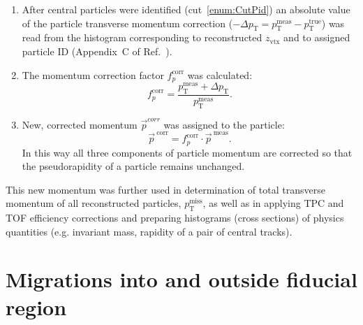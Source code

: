 \begin{enumerate}
	\item After central particles were identified (cut~\ref{enum:CutPid}) an absolute value of the particle transverse momentum correction ($-\Delta p_{\text{T}} = p_{\text{T}}^{\text{meas}}-p_{\text{T}}^{\text{true}}$) was read from the histogram corresponding to reconstructed $z_{\text{vtx}}$ and to assigned particle ID (Appendix~C of Ref.~\cite{supplementaryNote}).
	\item The momentum correction factor $f_{p}^{\text{corr}}$ was calculated:
	\begin{equation}\label{eq:pCorrFactor}
 f_{p}^{\text{corr}} = \frac{p_{\text{T}}^{\text{meas}} + \Delta p_{\text{T}}}{p_{\text{T}}^{\text{meas}}}.
  \end{equation}
  \item New, corrected momentum $\vec{p}^{corr}$ was assigned to the particle:
  \begin{equation}
   \vec{p}^{~\text{corr}} = f_{p}^{\text{corr}} \cdot \vec{p}^{~\text{meas}}.
  \end{equation}
  In this way all three components of particle momentum are corrected so that the pseudorapidity of a particle remains unchanged.
\end{enumerate}
This new momentum was further used in determination of total transverse momentum of all reconstructed particles, $p_{\text{T}}^{\text{miss}}$, as well as in applying TPC and TOF efficiency corrections and preparing histograms (cross sections) of physics quantities (e.g. invariant mass, rapidity of a pair of central tracks).



\section{Migrations into and outside fiducial region}\label{sec:migrations}

